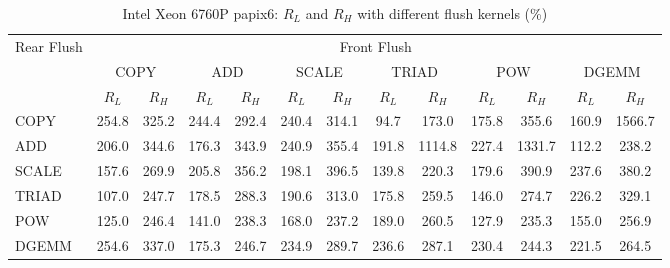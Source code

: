 \begin{table}[htbp]
\centering
\caption{Intel Xeon 6760P papix6: $R_L$ and $R_H$ with different flush kernels (\%)}
\label{tab:frkern-cgnr6760pn2-papix6}
\begin{tabular*}{\textwidth}{@{\extracolsep{\fill}}lcccccccccccc}
\toprule
\multirow{3}{*}{Rear Flush} & \multicolumn{12}{c}{Front Flush} \\ \cmidrule(lr){2-13}
& \multicolumn{2}{c}{COPY} & \multicolumn{2}{c}{ADD} & \multicolumn{2}{c}{SCALE} & \multicolumn{2}{c}{TRIAD} & \multicolumn{2}{c}{POW} & \multicolumn{2}{c}{DGEMM} \\ \cmidrule(lr){2-3} \cmidrule(lr){4-5} \cmidrule(lr){6-7} \cmidrule(lr){8-9} \cmidrule(lr){10-11} \cmidrule(lr){12-13}
& $R_L$ & $R_H$ & $R_L$ & $R_H$ & $R_L$ & $R_H$ & $R_L$ & $R_H$ & $R_L$ & $R_H$ & $R_L$ & $R_H$ \\ \midrule
COPY & 254.8 & 325.2 & 244.4 & 292.4 & 240.4 & 314.1 & 94.7 & 173.0 & 175.8 & 355.6 & 160.9 & 1566.7 \\
ADD & 206.0 & 344.6 & 176.3 & 343.9 & 240.9 & 355.4 & 191.8 & 1114.8 & 227.4 & 1331.7 & 112.2 & 238.2 \\
SCALE & 157.6 & 269.9 & 205.8 & 356.2 & 198.1 & 396.5 & 139.8 & 220.3 & 179.6 & 390.9 & 237.6 & 380.2 \\
TRIAD & 107.0 & 247.7 & 178.5 & 288.3 & 190.6 & 313.0 & 175.8 & 259.5 & 146.0 & 274.7 & 226.2 & 329.1 \\
POW & 125.0 & 246.4 & 141.0 & 238.3 & 168.0 & 237.2 & 189.0 & 260.5 & 127.9 & 235.3 & 155.0 & 256.9 \\
DGEMM & 254.6 & 337.0 & 175.3 & 246.7 & 234.9 & 289.7 & 236.6 & 287.1 & 230.4 & 244.3 & 221.5 & 264.5 \\
\bottomrule
\end{tabular*}
\end{table}